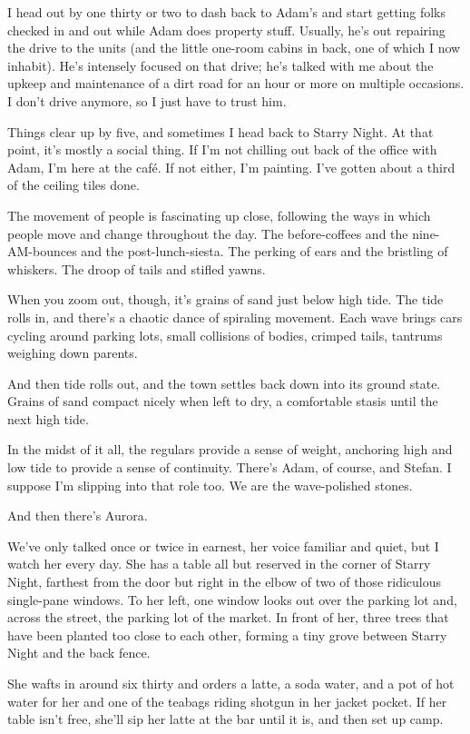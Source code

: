 I head out by one thirty or two to dash back to Adam's and start getting folks checked in and out while Adam does property stuff. Usually, he's out repairing the drive to the units (and the little one-room cabins in back, one of which I now inhabit). He's intensely focused on that drive; he's talked with me about the upkeep and maintenance of a dirt road for an hour or more on multiple occasions. I don't drive anymore, so I just have to trust him.

Things clear up by five, and sometimes I head back to Starry Night. At that point, it's mostly a social thing. If I'm not chilling out back of the office with Adam, I'm here at the café. If not either, I'm painting. I've gotten about a third of the ceiling tiles done.

The movement of people is fascinating up close, following the ways in which people move and change throughout the day. The before-coffees and the nine-AM-bounces and the post-lunch-siesta. The perking of ears and the bristling of whiskers. The droop of tails and stifled yawns.

When you zoom out, though, it's grains of sand just below high tide. The tide rolls in, and there's a chaotic dance of spiraling movement. Each wave brings cars cycling around parking lots, small collisions of bodies, crimped tails, tantrums weighing down parents.

And then tide rolls out, and the town settles back down into its ground state. Grains of sand compact nicely when left to dry, a comfortable stasis until the next high tide.

In the midst of it all, the regulars provide a sense of weight, anchoring high and low tide to provide a sense of continuity. There's Adam, of course, and Stefan. I suppose I'm slipping into that role too. We are the wave-polished stones.

And then there's Aurora.

We've only talked once or twice in earnest, her voice familiar and quiet, but I watch her every day. She has a table all but reserved in the corner of Starry Night, farthest from the door but right in the elbow of two of those ridiculous single-pane windows. To her left, one window looks out over the parking lot and, across the street, the parking lot of the market. In front of her, three trees that have been planted too close to each other, forming a tiny grove between Starry Night and the back fence.

She wafts in around six thirty and orders a latte, a soda water, and a pot of hot water for her and one of the teabags riding shotgun in her jacket pocket. If her table isn't free, she'll sip her latte at the bar until it is, and then set up camp.

